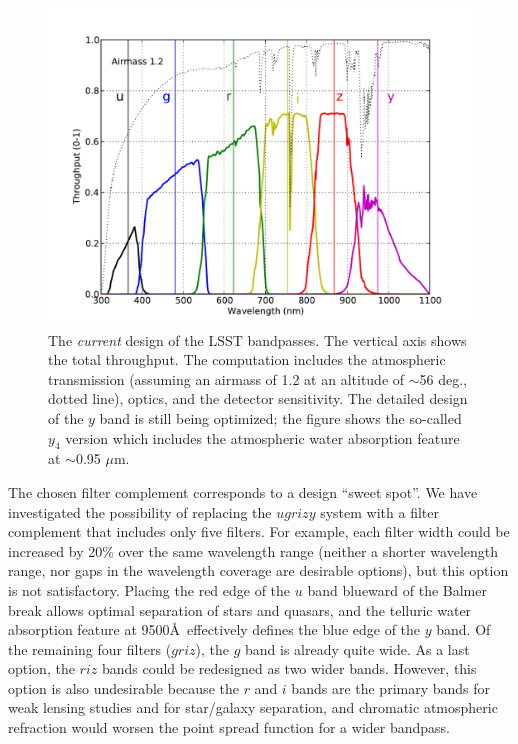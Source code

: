 \documentclass{emulateapj}
\begin{document}
\begin{figure}
\hskip -0.13in
\includegraphics[width=1.1\hsize,clip]{filters_y4.pdf}
\caption{The {\it current} design of the LSST bandpasses. 
The vertical axis shows the total throughput. The computation includes the atmospheric 
transmission (assuming an airmass of 1.2 at an altitude of $\sim$56 deg., dotted line), optics, and the 
detector sensitivity. The detailed design of the $y$ band is still being optimized; the figure 
shows the so-called $y_4$ version which includes the atmospheric water absorption feature 
at $\sim$0.95 $\mu$m.} 
\label{Fig:filters}
\end{figure}


The chosen filter complement corresponds to a design ``sweet spot''. We have 
investigated the possibility of replacing the $ugrizy$ system with a
filter complement that includes only five filters. For example, each filter
width could be increased by 20\% over the same wavelength range (neither a
shorter wavelength range, nor gaps in the wavelength coverage are desirable 
options), but this option is not satisfactory. Placing the red edge of the $u$ 
band blueward of the Balmer break allows optimal separation of stars and
quasars, and the telluric water absorption feature at 9500\AA\
effectively defines the blue edge of the $y$ band. Of the remaining four
filters ($griz$), the $g$ band is already quite wide. As a last option, the 
$riz$ bands could be redesigned as two wider bands. However, this option is also 
undesirable because the $r$ and $i$ bands are the primary bands for weak
lensing studies and for star/galaxy separation, and chromatic atmospheric
refraction would worsen the point spread function for a wider bandpass. 
\end{document}
